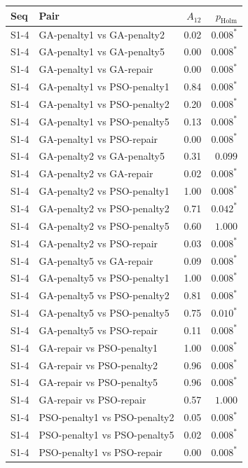 \begin{tabular}{llrr}
\toprule
Seq & Pair & $A_{12}$ & $p_{\mathrm{Holm}}$ \\
\midrule
S1-4 & GA-penalty1 vs GA-penalty2 & 0.02 & $0.008^{*}$ \\
S1-4 & GA-penalty1 vs GA-penalty5 & 0.00 & $0.008^{*}$ \\
S1-4 & GA-penalty1 vs GA-repair & 0.00 & $0.008^{*}$ \\
S1-4 & GA-penalty1 vs PSO-penalty1 & 0.84 & $0.008^{*}$ \\
S1-4 & GA-penalty1 vs PSO-penalty2 & 0.20 & $0.008^{*}$ \\
S1-4 & GA-penalty1 vs PSO-penalty5 & 0.13 & $0.008^{*}$ \\
S1-4 & GA-penalty1 vs PSO-repair & 0.00 & $0.008^{*}$ \\
S1-4 & GA-penalty2 vs GA-penalty5 & 0.31 & $0.099$ \\
S1-4 & GA-penalty2 vs GA-repair & 0.02 & $0.008^{*}$ \\
S1-4 & GA-penalty2 vs PSO-penalty1 & 1.00 & $0.008^{*}$ \\
S1-4 & GA-penalty2 vs PSO-penalty2 & 0.71 & $0.042^{*}$ \\
S1-4 & GA-penalty2 vs PSO-penalty5 & 0.60 & $1.000$ \\
S1-4 & GA-penalty2 vs PSO-repair & 0.03 & $0.008^{*}$ \\
S1-4 & GA-penalty5 vs GA-repair & 0.09 & $0.008^{*}$ \\
S1-4 & GA-penalty5 vs PSO-penalty1 & 1.00 & $0.008^{*}$ \\
S1-4 & GA-penalty5 vs PSO-penalty2 & 0.81 & $0.008^{*}$ \\
S1-4 & GA-penalty5 vs PSO-penalty5 & 0.75 & $0.010^{*}$ \\
S1-4 & GA-penalty5 vs PSO-repair & 0.11 & $0.008^{*}$ \\
S1-4 & GA-repair vs PSO-penalty1 & 1.00 & $0.008^{*}$ \\
S1-4 & GA-repair vs PSO-penalty2 & 0.96 & $0.008^{*}$ \\
S1-4 & GA-repair vs PSO-penalty5 & 0.96 & $0.008^{*}$ \\
S1-4 & GA-repair vs PSO-repair & 0.57 & $1.000$ \\
S1-4 & PSO-penalty1 vs PSO-penalty2 & 0.05 & $0.008^{*}$ \\
S1-4 & PSO-penalty1 vs PSO-penalty5 & 0.02 & $0.008^{*}$ \\
S1-4 & PSO-penalty1 vs PSO-repair & 0.00 & $0.008^{*}$ \\

\end{tabular}
